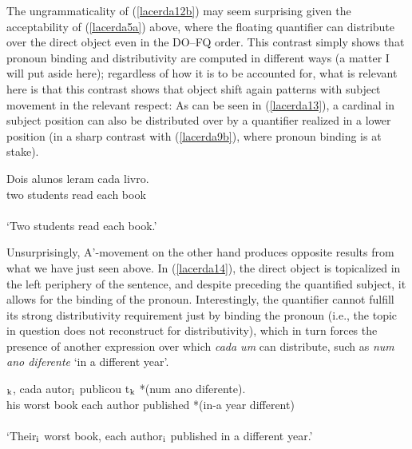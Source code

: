 \documentclass[output=paper]{langscibook}
\begin{document}
The ungrammaticality of (\ref{lacerda12b}) may seem surprising given the acceptability of (\ref{lacerda5a}) above, where the floating quantifier can distribute over the direct object even in the DO–FQ order. This contrast simply shows that pronoun binding and distributivity are computed in different ways (a matter I will put aside here); regardless of how it is to be accounted for, what is relevant here is that this contrast shows that object shift again patterns with subject movement in the relevant respect: As can be seen in (\ref{lacerda13}), a cardinal in subject position can also be distributed over by a quantifier realized in a lower position (in a sharp contrast with (\ref{lacerda9b}), where pronoun binding is at stake).

\begin{exe}
\ex \label{lacerda13}
\gll Dois 	alunos 	leram 	cada 	livro.\\
two	students	read	each	book\\\\
`Two students read each book.’
\end{exe}

Unsurprisingly, A’-movement on the other hand produces opposite results from what we have just seen above. In (\ref{lacerda14}), the direct object is topicalized in the left periphery of the sentence, and despite preceding the quantified subject, it allows for the binding of the pronoun. Interestingly, the quantifier cannot fulfill its strong distributivity requirement just by binding the pronoun (i.e., the topic in question does not reconstruct for distributivity), which in turn forces the presence of another expression over which \emph{cada um} can distribute, such as \emph{num ano diferente} ‘in a different year’.

\begin{exe}
\ex \label{lacerda14}
$_{\textnormal{k}}$,	cada	autor$_{\textnormal{i}}$	publicou	t$_{\textnormal{k}}$ 	*(num	ano	diferente).\\
his	worst	book	each	author	published	{}	*(in-a	year	different)\\\\
`Their$_{\textnormal{i}}$ worst book, each author$_{\textnormal{i}}$ published in a different year.’
\end{exe}
\end{document}
